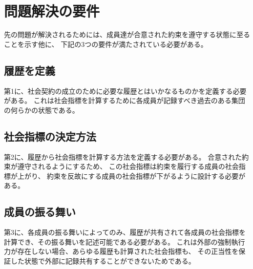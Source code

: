\section{問題解決の要件}
先の問題が解決されるためには、成員達が合意された約束を遵守する状態に至ることを示す他に、
下記の3つの要件が満たされている必要がある。

\subsection{履歴を定義}
第1に、社会契約の成立のために必要な履歴とはいかなるものかを定義する必要がある。
これは社会指標を計算するために各成員が記録すべき過去のある集団の何らかの状態である。

\subsection{社会指標の決定方法}
第2に、履歴から社会指標を計算する方法を定義する必要がある。
合意された約束が遵守されるようにするため、
この社会指標は約束を履行する成員の社会指標が上がり、
約束を反故にする成員の社会指標が下がるように設計する必要がある。

\subsection{成員の振る舞い}
第3に、各成員の振る舞いによってのみ、履歴が共有されて各成員の社会指標を計算でき、その振る舞いを記述可能である必要がある。
これは外部の強制執行力が存在しない場合、あらゆる履歴も計算された社会指標も、
その正当性を保証した状態で外部に記録共有することができないためである。